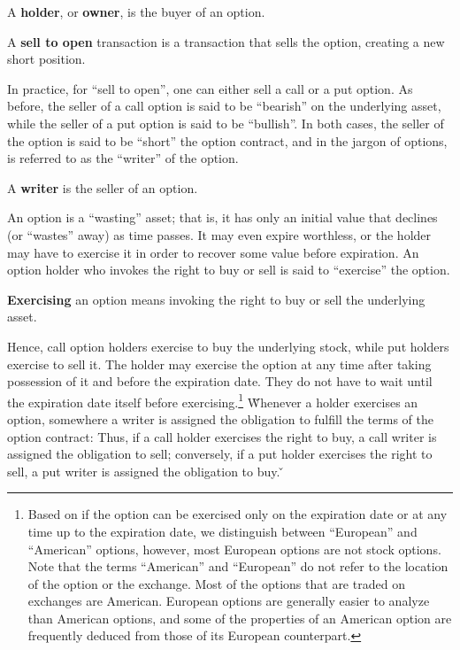 A \textbf{holder}, or \textbf{owner}, is the buyer of an option.
\ed

A \textbf{sell to open} transaction is a transaction that sells the option, creating a new short position.
\ed

In practice, for ``sell to open'', one can either sell a call or a put option. As before, the seller of a call option is
said to be ``bearish'' on the underlying asset, while the seller of a put option is said to be ``bullish''. In both
cases, the seller of the option is said to be ``short'' the option contract, and in the jargon of options, is referred
to as the ``writer'' of the option.

\bd[Writer]
A \textbf{writer} is the seller of an option.
\ed

An option is a ``wasting'' asset; that is, it has only an initial value that declines (or ``wastes'' away) as time
passes. It may even expire worthless, or the holder may have to exercise it in order to recover some value before
expiration. An option holder who invokes the right to buy or sell is said to ``exercise'' the option.

\bd[Exercise]
\textbf{Exercising} an option means invoking the right to buy or sell the underlying asset.
\ed

Hence, call option holders exercise to buy the underlying stock, while put holders exercise to sell it. The holder may
exercise the option at any time after taking possession of it and before the expiration date. They do not have to wait
until the expiration date itself before exercising.\footnote{Based on if the option can be exercised only on the
expiration date or at any time up to the expiration date, we distinguish between ``European'' and ``American'' options,
however, most European options are not stock options. Note that the terms ``American'' and ``European'' do not refer to
the location of the option or the exchange. Most of the options that are traded on exchanges are American. European
options are generally easier to analyze than American options, and some of the properties of an American option are
frequently deduced from those of its European counterpart.} \v

Whenever a holder exercises an option, somewhere a writer is assigned the obligation to fulfill the terms of the
option contract: Thus, if a call holder exercises the right to buy, a call writer is assigned the obligation to
sell; conversely, if a put holder exercises the right to sell, a put writer is assigned the obligation to buy. \v

